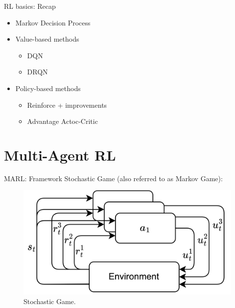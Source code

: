 \documentclass[9pt, hyperref={pdfusetitle,colorlinks=true,allcolors=DarkBlue}]{beamer}
\begin{document}
\begin{frame}{RL basics: Recap}

    

\begin{itemize}
    \item Markov Decision Process
    \vfill
    \item Value-based methods
        \begin{itemize}
        \item DQN
        \item DRQN
        \end{itemize}{}
    \vfill
    \item Policy-based methods
        \begin{itemize}
        \item Reinforce + improvements
        \item Advantage Actoc-Critic
        \end{itemize}{}
    \vfill
\end{itemize}{}

\end{frame}

\section{Multi-Agent RL}
\begin{frame}{MARL: Framework}
    Stochastic Game (also referred to as Markov Game):
    \vfill
    \begin{figure}
        \centering
        \includegraphics[width=\linewidth]{SG.png}
        \caption{Stochastic Game.}
        \label{fig:enter-labelaze123}
    \end{figure}
\end{frame}
\end{document}
